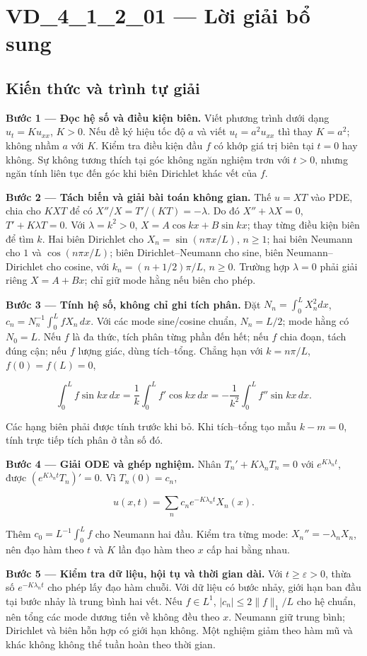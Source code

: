 \documentclass[10pt,a4paper]{article}
\begin{document}
\section*{VD\_4\_1\_2\_01 — Lời giải bổ sung}
\subsection*{Kiến thức và trình tự giải}
\textbf{Bước 1 — Đọc hệ số và điều kiện biên.} Viết phương trình dưới dạng $u_t=Ku_{xx}$, $K>0$. Nếu đề ký hiệu tốc độ $a$ và viết $u_t=a^2u_{xx}$ thì thay $K=a^2$; không nhầm $a$ với $K$. Kiểm tra điều kiện đầu $f$ có khớp giá trị biên tại $t=0$ hay không. Sự không tương thích tại góc không ngăn nghiệm trơn với $t>0$, nhưng ngăn tính liên tục đến góc khi biên Dirichlet khác vết của $f$.

\textbf{Bước 2 — Tách biến và giải bài toán không gian.} Thế $u=XT$ vào PDE, chia cho $KXT$ để có $X''/X=T'/(KT)=-\lambda$. Do đó $X''+\lambda X=0$, $T'+K\lambda T=0$. Với $\lambda=k^2>0$, $X=A\cos kx+B\sin kx$; thay từng điều kiện biên để tìm $k$. Hai biên Dirichlet cho $X_n=\sin(n\pi x/L)$, $n\ge1$; hai biên Neumann cho $1$ và $\cos(n\pi x/L)$; biên Dirichlet–Neumann cho sine, biên Neumann–Dirichlet cho cosine, với $k_n=(n+1/2)\pi/L$, $n\ge0$. Trường hợp $\lambda=0$ phải giải riêng $X=A+Bx$; chỉ giữ mode hằng nếu biên cho phép.

\textbf{Bước 3 — Tính hệ số, không chỉ ghi tích phân.} Đặt $N_n=\int_0^L X_n^2dx$, $c_n=N_n^{-1}\int_0^L fX_n\,dx$. Với các mode sine/cosine chuẩn, $N_n=L/2$; mode hằng có $N_0=L$. Nếu $f$ là đa thức, tích phân từng phần đến hết; nếu $f$ chia đoạn, tách đúng cận; nếu $f$ lượng giác, dùng tích–tổng. Chẳng hạn với $k=n\pi/L$, $f(0)=f(L)=0$,


\[
\int_0^Lf\sin kx\,dx=\frac1k\int_0^Lf'\cos kx\,dx
=-\frac1{k^2}\int_0^Lf''\sin kx\,dx.
\]


Các hạng biên phải được tính trước khi bỏ. Khi tích–tổng tạo mẫu $k-m=0$, tính trực tiếp tích phân ở tần số đó.

\textbf{Bước 4 — Giải ODE và ghép nghiệm.} Nhân $T_n'+K\lambda_nT_n=0$ với $e^{K\lambda_nt}$, được $(e^{K\lambda_nt}T_n)'=0$. Vì $T_n(0)=c_n$,


\[
u(x,t)=\sum_n c_ne^{-K\lambda_nt}X_n(x).
\]


Thêm $c_0=L^{-1}\int_0^Lf$ cho Neumann hai đầu. Kiểm tra từng mode: $X_n''=-\lambda_nX_n$, nên đạo hàm theo $t$ và $K$ lần đạo hàm theo $x$ cấp hai bằng nhau.

\textbf{Bước 5 — Kiểm tra dữ liệu, hội tụ và thời gian dài.} Với $t\ge\varepsilon>0$, thừa số $e^{-K\lambda_nt}$ cho phép lấy đạo hàm chuỗi. Với dữ liệu có bước nhảy, giới hạn ban đầu tại bước nhảy là trung bình hai vết. Nếu $f\in L^1$, $|c_n|\le2\|f\|_1/L$ cho hệ chuẩn, nên tổng các mode dương tiến về không đều theo $x$. Neumann giữ trung bình; Dirichlet và biên hỗn hợp có giới hạn không. Một nghiệm giảm theo hàm mũ và khác không không thể tuần hoàn theo thời gian.
\end{document}
